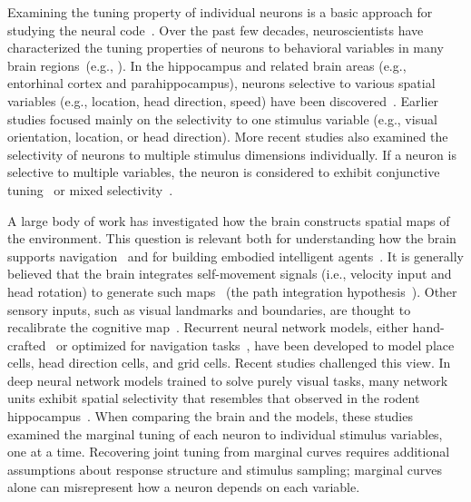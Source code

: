 \documentclass[11pt]{article}
\begin{document}
Examining the tuning property of individual neurons is a basic approach for studying the neural code~\cite{Hubel1959,o1971,Hafting2005,Deangelis1991,decharms2000neural,Stensola2012,Kriegeskorte2021}. Over the past few decades, neuroscientists have characterized the tuning properties of neurons to behavioral variables in many brain regions~(e.g., \cite{Hafting2005,Deangelis1991,decharms2000neural,Stensola2012,Taube1990}).
In the hippocampus and related brain areas (e.g., entorhinal cortex and parahippocampus), neurons selective to various spatial variables (e.g., location, head direction, speed) have been discovered~\cite{o1971,o1978,Hafting2005,Stensola2012,Kropff2015speed,Taube1990}. Earlier studies focused mainly on the selectivity to one stimulus variable (e.g., visual orientation, location, or head direction). More recent studies also examined the selectivity of neurons to multiple stimulus dimensions individually. If a neuron is selective to multiple variables, the neuron is considered to exhibit conjunctive tuning~\cite{Sargolini2006conjunctive} or mixed selectivity~\cite{Rigotti2013,Fusi2016neurons,Hardcastle2017multiplexed}.

A large body of work has investigated how the brain constructs spatial maps of the environment. This question is relevant both for understanding how the brain supports navigation~\cite{Mcnaughton2006} and for building embodied intelligent agents~\cite{Cadena2017}.
It is generally believed that the brain integrates self-movement signals (i.e., velocity input and head rotation) to generate such maps~\cite{Mcnaughton2006} (the path integration hypothesis~\cite{Darwin1873}). Other sensory inputs, such as visual landmarks and boundaries, are thought to recalibrate the cognitive map~\cite{Hardcastle2015environmental,Zhang1996}. Recurrent neural network models, either hand-crafted~\cite{Samsonovich1997,Zhang1996,Burak2009} or optimized for navigation tasks~\cite{Cueva2018,Banino2018,Sorscher2020,Cueva2020,Gao2021}, have been developed to model place cells, head direction cells, and grid cells.
Recent studies challenged this view. In deep neural network models trained to solve purely visual tasks, many network units exhibit spatial selectivity that resembles that observed in the rodent hippocampus~\cite{Gornet2024automated,Luo2024}.
When comparing the brain and the models, these studies examined the marginal tuning of each neuron to individual stimulus variables, one at a time. Recovering joint tuning from marginal curves requires additional assumptions about response structure and stimulus sampling; marginal curves alone can misrepresent how a neuron depends on each variable.
\end{document}
